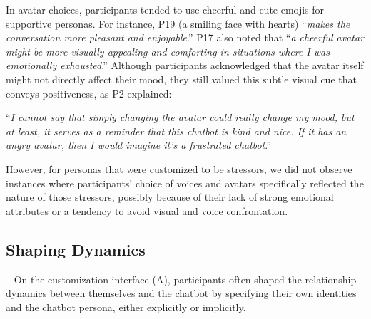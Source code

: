 In avatar choices, participants tended to use cheerful and cute emojis for supportive personas. For instance, P19   (a smiling face with hearts)  ``\textit{makes the conversation more pleasant and enjoyable}.''  P17 also noted that ``\textit{a cheerful avatar might be more visually appealing and comforting in situations where I was emotionally exhausted}.''
Although participants acknowledged that the avatar itself might not directly affect their mood, they still valued this subtle visual cue that conveys positiveness, as P2 explained: 

``\textit{I cannot say that simply changing the avatar could really change my mood, but at least, it serves as a reminder that this chatbot is kind and nice. If it has an angry avatar, then I would imagine it's a frustrated chatbot}.''
 

However, for personas that were customized to be stressors, we did not observe instances where participants' choice of voices and avatars specifically reflected the nature of those stressors, possibly because of their lack of strong emotional attributes or a tendency to avoid visual and voice confrontation.

\vspace{-2mm}
\subsection{Shaping  Dynamics}~\label{dynamics}
On the customization interface (A), participants often shaped the relationship dynamics between themselves and the chatbot by specifying their own identities and the chatbot persona, either explicitly or implicitly.


